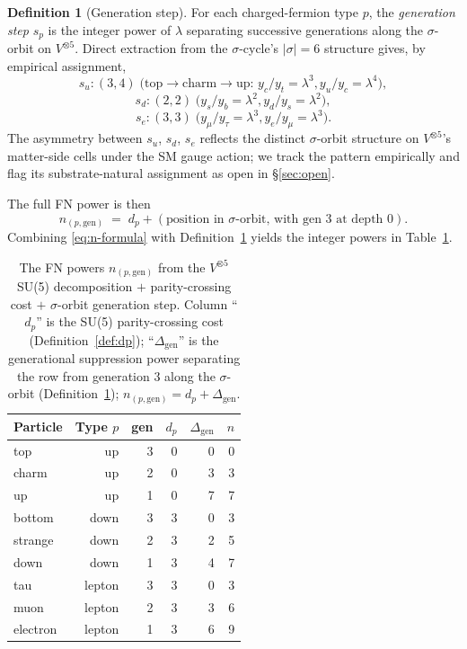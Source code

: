 \documentclass[11pt,reqno]{amsart}
\theoremstyle{plain}
\theoremstyle{definition}
\newtheorem{definition}[theorem]{Definition}
\theoremstyle{remark}
\begin{document}
\begin{definition}[Generation step]\label{def:step}
For each charged-fermion type $p$, the \emph{generation step}
$s_{p}$ is the integer power of $\lambda$ separating successive
generations along the $\sigma$-orbit on $V^{\otimes 5}$. Direct
extraction from the $\sigma$-cycle's $|\sigma| = 6$ structure
gives, by empirical assignment,
\[
  s_{u} : (3, 4) \;\text{(top$\to$charm$\to$up: } y_{c}/y_{t} = \lambda^{3}, y_{u}/y_{c} = \lambda^{4}),
\]
\[
  s_{d} : (2, 2) \;\text{(}y_{s}/y_{b} = \lambda^{2}, y_{d}/y_{s} = \lambda^{2}),
\]
\[
  s_{e} : (3, 3) \;\text{(}y_{\mu}/y_{\tau} = \lambda^{3}, y_{e}/y_{\mu} = \lambda^{3}).
\]
The asymmetry between $s_{u}$, $s_{d}$, $s_{e}$ reflects the
distinct $\sigma$-orbit structure on $V^{\otimes 5}$'s
matter-side cells under the SM gauge action; we track the
pattern empirically and flag its substrate-natural assignment
as open in \S\ref{sec:open}.
\end{definition}

The full FN power is then
\begin{equation}
  n_{(p, \mathrm{gen})} \;=\; d_{p} + (\text{position in $\sigma$-orbit, with gen 3 at depth 0}).\label{eq:n-formula}
\end{equation}
Combining \eqref{eq:n-formula} with Definition~\ref{def:step}
yields the integer powers in Table~\ref{tab:powers}.

\begin{table}[h]
\centering
\caption{The FN powers $n_{(p,\mathrm{gen})}$ from the
$V^{\otimes 5}$ SU(5) decomposition $+$ parity-crossing cost
$+$ $\sigma$-orbit generation step. Column ``$d_{p}$'' is the
SU(5) parity-crossing cost (Definition~\ref{def:dp});
``$\Delta_{\mathrm{gen}}$'' is the generational suppression
power separating the row from generation $3$ along the
$\sigma$-orbit (Definition~\ref{def:step});
$n_{(p,\mathrm{gen})} = d_{p} + \Delta_{\mathrm{gen}}$.}
\label{tab:powers}
\begin{tabular}{lrrrrr}
\toprule
Particle & Type $p$ & gen & $d_{p}$ & $\Delta_{\mathrm{gen}}$ & $n$ \\
\midrule
top      & up     & 3 & 0 & 0 & 0 \\
charm    & up     & 2 & 0 & 3 & 3 \\
up       & up     & 1 & 0 & 7 & 7 \\
bottom   & down   & 3 & 3 & 0 & 3 \\
strange  & down   & 2 & 3 & 2 & 5 \\
down     & down   & 1 & 3 & 4 & 7 \\
tau      & lepton & 3 & 3 & 0 & 3 \\
muon     & lepton & 2 & 3 & 3 & 6 \\
electron & lepton & 1 & 3 & 6 & 9 \\
\bottomrule
\end{tabular}
\end{table}
\end{document}
